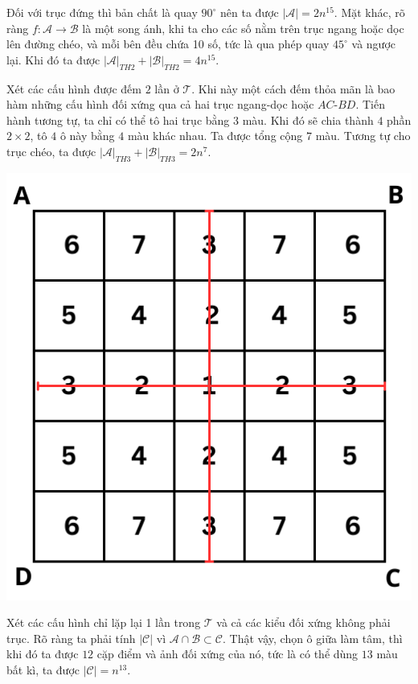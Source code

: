 \documentclass[11pt]{scrartcl}
\begin{document}
\begin{itemize}[label=, leftmargin=0em, itemsep=0.5em]
\begin{sol}
\begin{center}
            \end{center}
            Đối với trục đứng thì bản chất là quay $90^{\circ}$ nên ta được $|\mathcal{A}| = 2n^{15}$. Mặt khác, rõ ràng $f: \mathcal{A} \to \mathcal{B}$ là một song ánh, khi ta cho các số nằm trên trục ngang hoặc dọc lên đường chéo, và mỗi bên đều chứa 10 số, tức là qua phép quay $45^{\circ}$ và ngược lại. Khi đó ta được $|\mathcal{A}|_{TH2} + |\mathcal{B}|_{TH2} = 4n^{15}$.

            Xét các cấu hình được đếm $2$ lần ở $\mathcal{T}$. Khi này một cách đếm thỏa mãn là bao hàm những cấu hình đối xứng qua cả hai trục ngang-dọc hoặc $AC$-$BD$. Tiến hành tương tự, ta chỉ có thể tô hai trục bằng $3$ màu. Khi đó sẽ chia thành $4$ phần $2\times2$, tô $4$ ô này bằng $4$ màu khác nhau. Ta được tổng cộng $7$ màu. Tương tự cho trục chéo, ta được $|\mathcal{A}|_{TH3} + |\mathcal{B}|_{TH3} = 2n^{7}$.
            \begin{center}
                \includegraphics[scale=0.57]{+.pdf}
            \end{center}
            Xét các cấu hình chỉ lặp lại 1 lần trong $\mathcal{T}$ và cả các kiểu đối xứng không phải trục. Rõ ràng ta phải tính $|\mathcal{C}|$ vì $\mathcal{A} \cap \mathcal{B} \subset \mathcal{C}$. Thật vậy, chọn ô giữa làm tâm, thì khi đó ta được $12$ cặp điểm và ảnh đối xứng của nó, tức là có thể dùng $13$ màu bất kì, ta được $|\mathcal{C}| = n^{13}$.

\end{sol}
\end{itemize}
\end{document}
